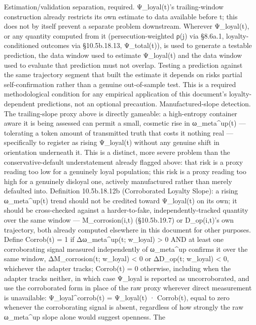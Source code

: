 \documentclass[
]{article}
\begin{document}
Estimation/validation separation, required. Ψ\_loyal(t)'s
trailing-window construction already restricts its own estimate to data
available before t; this does not by itself prevent a separate problem
downstream. Wherever Ψ\_loyal(t), or any quantity computed from it
(persecution-weighted ρ(j) via §8.6a.1, loyalty-conditioned outcomes via
§10.5b.18.13, Ψ\_total(t)), is used to generate a testable prediction,
the data window used to estimate Ψ\_loyal(t) and the data window used to
evaluate that prediction must not overlap. Testing a prediction against
the same trajectory segment that built the estimate it depends on risks
partial self-confirmation rather than a genuine out-of-sample test. This
is a required methodological condition for any empirical application of
this document's loyalty-dependent predictions, not an optional
precaution. Manufactured-slope detection. The trailing-slope proxy above
is directly gameable: a high-entropy container aware it is being
assessed can permit a small, cosmetic rise in ω\_meta\^{}up(t) ---
tolerating a token amount of transmitted truth that costs it nothing
real --- specifically to register as rising Ψ\_loyal(t) without any
genuine shift in orientation underneath it. This is a distinct, more
severe problem than the conservative-default understatement already
flagged above: that risk is a proxy reading too low for a genuinely
loyal population; this risk is a proxy reading too high for a genuinely
disloyal one, actively manufactured rather than merely defaulted into.
Definition 10.5b.18.12b (Corroborated Loyalty Slope): a rising
ω\_meta\^{}up(t) trend should not be credited toward Ψ\_loyal(t) on its
own; it should be cross-checked against a harder-to-fake,
independently-tracked quantity over the same window ---
M\_corrosion(i,t) (§10.5b.19.7) or D\_op(i,t)'s own trajectory, both
already computed elsewhere in this document for other purposes. Define
Corrob(t) = 1 if Δω\_meta\^{}up(t; w\_loyal) \textgreater{} 0 AND at
least one corroborating signal measured independently of ω\_meta\^{}up
confirms it over the same window, ΔM\_corrosion(t; w\_loyal) \textless{}
0 or ΔD\_op(t; w\_loyal) \textless{} 0, whichever the adapter tracks;
Corrob(t) = 0 otherwise, including when the adapter tracks neither, in
which case Ψ\_loyal is reported as uncorroborated, and use the
corroborated form in place of the raw proxy wherever direct measurement
is unavailable: Ψ\_loyal\^{}corrob(t) = Ψ\_loyal(t) · Corrob(t), equal
to zero whenever the corroborating signal is absent, regardless of how
strongly the raw ω\_meta\^{}up slope alone would suggest openness. The
\end{document}
